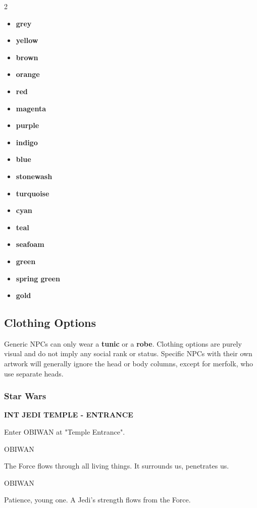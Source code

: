 \documentclass[11pt,letterpaper,oldstylefigures]{memoir}
\newcommand{\slugline}[1]{\nobreak\textbf{\MakeUppercase{#1}}\par\nobreak\vspace{1\baselineskip}}
\newcommand{\speaker}[1]{\nobreak\hspace*{0.333\textwidth}\MakeUppercase{#1}\par\nobreak\vspace{0.5\baselineskip}}
\newcommand{\dialogue}[1]{\nobreak\hspace*{0.25\textwidth}\begin{minipage}{0.5\textwidth}#1\end{minipage}\par\vspace{1\baselineskip}}
\newcommand{\stagedir}[1]{#1\par\vspace{1\baselineskip}}
\newenvironment{FountainExample}
  {\begingroup
  \ttfamily\small
   \setlength{\parindent}{0pt}
  \setlength{\parskip}{0.5em}
  \allowdisplaybreaks
  \setlength{\displaywidowpenalty}{0}
  \setlength{\widowpenalty}{0}
  \setlength{\clubpenalty}{0}
  \setlength{\interlinepenalty}{0}
}
  {\endgroup}
\newcommand{\paragraphbreak}{\vspace{0.5em}}
\newcommand{\fountain}[1]{\textbf{#1}}
\begin{document}
\begin{multicols}{2}
\begin{itemize}
\item \fountain{grey}
\item \fountain{yellow}
\item \fountain{brown}
\item \fountain{orange}
\item \fountain{red}
\item \fountain{magenta}
\item \fountain{purple}
\item \fountain{indigo}
\item \fountain{blue}
\item \fountain{stonewash}
\item \fountain{turquoise}
\item \fountain{cyan}
\item \fountain{teal}
\item \fountain{seafoam}
\item \fountain{green}
\item \fountain{spring green}
\item \fountain{gold}
\end{itemize}
\end{multicols}

\subsection{Clothing Options}
\paragraphbreak

Generic NPCs can only wear a \fountain{tunic} or a \fountain{robe}. Clothing options are purely visual and do not imply any social rank or status. Specific NPCs with their own artwork will generally ignore the head or body columns, except for merfolk, who use separate heads.

\paragraphbreak

\subsubsection*{Star Wars}
\label{ex:star-wars}

\begin{FountainExample}
\slugline{INT JEDI TEMPLE - ENTRANCE}

\stagedir{Enter OBIWAN at "Temple Entrance".}

\speaker{OBIWAN}
\dialogue{The Force flows through all living things. It surrounds us, penetrates us.}

\speaker{OBIWAN}
\dialogue{Patience, young one. A Jedi's strength flows from the Force.}
\end{FountainExample}
\end{document}
